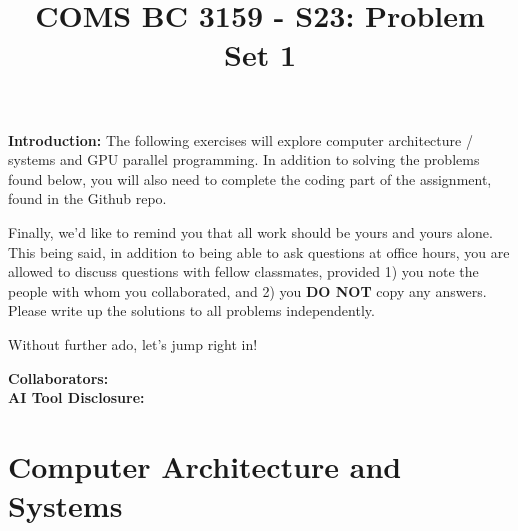\documentclass[]{article}
\title{COMS BC 3159 - S23: Problem Set 1}
\author{
}
\date{}
\begin{document}
\maketitle

\textbf{Introduction:}  
The following exercises will explore computer architecture / systems and GPU parallel programming. In addition to solving the problems found below, you will also need to complete the coding part of the assignment, found in the Github repo. 

Finally, we'd like to remind you that all work should be yours and yours alone. This being said, in addition to being able to ask questions at office hours, you are allowed to discuss questions with fellow classmates, provided 1) you note the people with whom you collaborated, and 2) you \textbf{DO NOT} copy any answers. Please write up the solutions to all problems independently.

Without further ado, let's jump right in!

\bigskip
\textbf{Collaborators:}
\\
\textbf{AI Tool Disclosure:}

\clearpage
\section{Computer Architecture and Systems}
\end{document}
